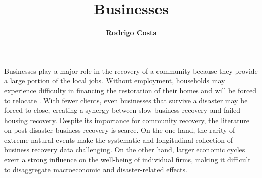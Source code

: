 %
%
%


%
%
%
%
%
%
%
%

\title{Businesses}
\author{
    \textbf{Rodrigo Costa}}
\tocauthor{}
%
%
\maketitle
Businesses play a major role in the recovery of a community because they provide a large portion of the local jobs. Without employment, households may experience difficulty in financing the restoration of their homes and will be forced to relocate \citep{bolin1983recovery,wang2015influencing}. With fewer clients, even businesses that survive a disaster may be forced to close, creating a synergy between slow business recovery and failed housing recovery. Despite its importance for community recovery, the literature on post-disaster business recovery is scarce. On the one hand, the rarity of extreme natural events make the systematic and longitudinal collection of business recovery data challenging. On the other hand, larger economic cycles exert a strong influence on the well-being of individual firms, making it difficult to disaggregate macroeconomic and disaster-related effects.

